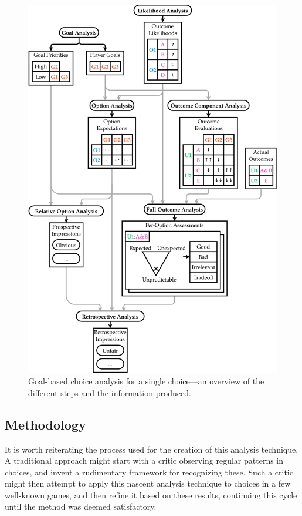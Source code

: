 \begin{figure}[!p]
\centering
\includegraphics[height=0.92\textheight]{fig/analysis-method-crop.pdf}
\caption[Choice analysis flowchart]{Goal-based choice analysis for a single choice---an overview of the different steps and the information produced.}
\label{fig:choice-analysis-method}
\end{figure}

\subsection{Methodology}

It is worth reiterating the process used for the creation of this analysis technique.
%
A traditional approach might start with a critic observing regular patterns in choices, and invent a rudimentary framework for recognizing these.
%
Such a critic might then attempt to apply this nascent analysis technique to choices in a few well-known games, and then refine it based on these results, continuing this cycle until the method was deemed satisfactory.


